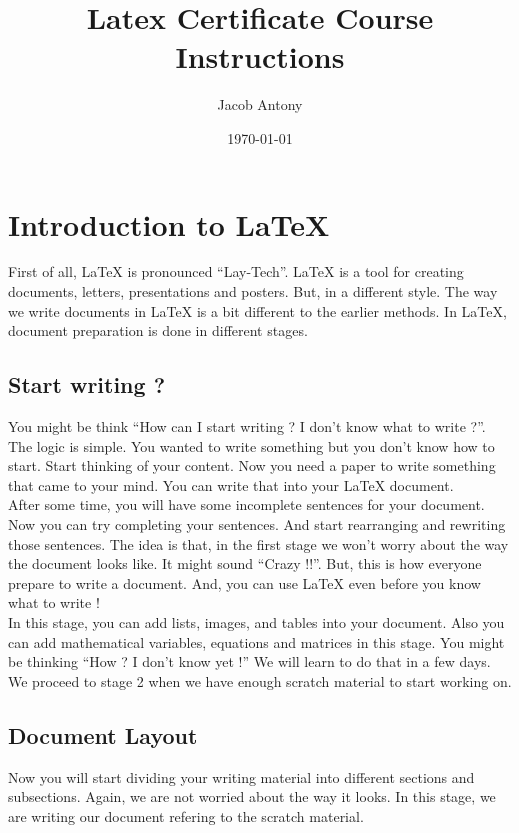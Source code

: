 \documentclass{article}
\title{Latex Certificate Course Instructions}
\author{Jacob Antony}
\date{\today}
\begin{document}
\maketitle

\section{Introduction to LaTeX}
First of all, LaTeX is pronounced ``Lay-Tech''. LaTeX is a tool for creating documents, letters, presentations and posters. But, in a different style. The way we write documents in LaTeX is a bit different to the earlier methods. In LaTeX, document preparation is done in different stages.

\subsection{Start writing ?}
You might be think ``How can I start writing ? I don't know what to write ?''. The logic is simple. You wanted to write something but you don't know how to start. Start thinking of your content. Now you need a paper to write something that came to your mind. You can write that into your LaTeX document.\\
	
After some time, you will have some incomplete sentences for your document. Now you can try completing your sentences. And start rearranging and rewriting those sentences. The idea is that, in the first stage we won't worry about the way the document looks like. It might sound ``Crazy !!''. But, this is how everyone prepare to write a document. And, you can use LaTeX even before you know what to write !\\

In this stage, you can add lists, images, and tables into your document. Also you can add mathematical variables, equations and matrices in this stage. You might be thinking ``How ? I don't know yet !'' We will learn to do that in a few days. We proceed to stage 2 when we have enough scratch material to start working on.

\subsection{Document Layout}
Now you will start dividing your writing material into different sections and subsections. Again, we are not worried about the way it looks. In this stage, we are writing our document refering to the scratch material.\\
\end{document}
